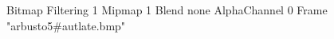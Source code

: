 {Bitmap
	{Filtering 1}
	{Mipmap 1}
	{Blend none}
	{AlphaChannel 0}
	{Frame "arbusto5#autlate.bmp"}
}
